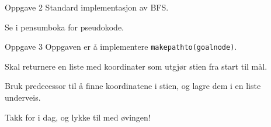 \documentclass[14pt]{beamer}
\begin{document}
\begin{frame}{Oppgave 2}
    Standard implementasjon av BFS.

    \pause

    Se i pensumboka for pseudokode.
\end{frame}
\begin{frame}[fragile]{Oppgave 3}
    Oppgaven er å implementere \verb|makepathto(goalnode)|.

    \pause

    Skal returnere en liste med koordinater som utgjør stien fra start til mål.

    \pause

    Bruk predecessor til å finne koordinatene i stien, og lagre dem i en liste underveis.
\end{frame}
\begin{frame}[standout]
    Takk for i dag, og lykke til med øvingen!
\end{frame}
\end{document}
